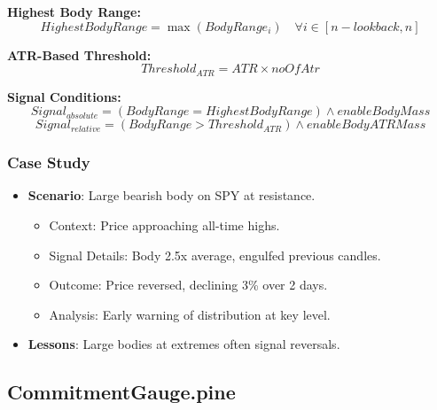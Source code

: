 \documentclass[12pt]{article}
\begin{document}
\textbf{Highest Body Range:}
\[
HighestBodyRange = \max(BodyRange_i) \quad \forall i \in [n-lookback, n]
\]

\textbf{ATR-Based Threshold:}
\[
Threshold_{ATR} = ATR \times noOfAtr
\]

\textbf{Signal Conditions:}
\[
Signal_{absolute} = (BodyRange = HighestBodyRange) \land enableBodyMass
\]
\[
Signal_{relative} = (BodyRange > Threshold_{ATR}) \land enableBodyATRMass
\]

\subsubsection{Case Study}
\begin{itemize}
\item \textbf{Scenario}: Large bearish body on SPY at resistance.
  \begin{itemize}
  \item Context: Price approaching all-time highs.
  \item Signal Details: Body 2.5x average, engulfed previous candles.
  \item Outcome: Price reversed, declining 3\% over 2 days.
  \item Analysis: Early warning of distribution at key level.
  \end{itemize}
\item \textbf{Lessons}: Large bodies at extremes often signal reversals.
\end{itemize}

\subsection{CommitmentGauge.pine}
\label{subsec:commitment}
\end{document}

